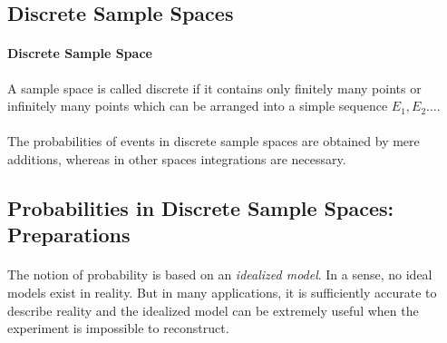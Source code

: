 \documentclass{article}
\numberwithin{equation}{subsection}
\begin{document}
		\subsection{Discrete Sample Spaces}
			\paragraph{Discrete Sample Space} A sample space is called discrete if it contains only finitely many points or infinitely many points which can be arranged into a simple sequence $E_1,E_2\dots$. 
			\paragraph{} The probabilities of events in discrete sample spaces are obtained by mere additions, whereas in other spaces integrations are necessary.
		\subsection{Probabilities in Discrete Sample Spaces: Preparations}
			\paragraph{} The notion of probability is based on an \textit{idealized model}. In a sense, no ideal models exist in reality. But in many applications, it is sufficiently accurate to describe reality and the idealized model can be extremely useful when the experiment is impossible to reconstruct.
\end{document}
